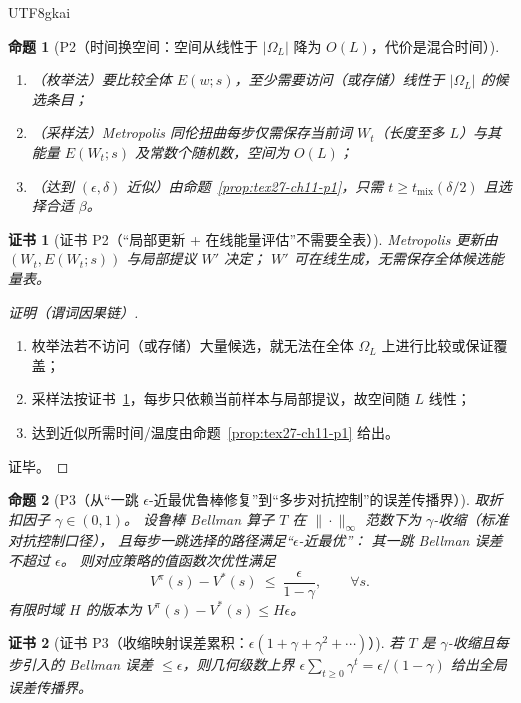 \documentclass[12pt]{article}
\newtheorem{proposition}{命题}[section]
\newtheorem{Certificate}{证书}[section]
\begin{document}
\begin{CJK*}{UTF8}{gkai}
\begin{proposition}[P2（时间换空间：空间从线性于 $|\Omega_L|$ 降为 $O(L)$，代价是混合时间）]
\label{prop:tex27-ch11-p2}
\begin{enumerate}
  \item（枚举法）要比较全体 $E(w;s)$，至少需要访问（或存储）线性于 $|\Omega_L|$ 的候选条目；
  \item（采样法）Metropolis 同伦扭曲每步仅需保存当前词 $W_t$（长度至多 $L$）与其能量 $E(W_t;s)$ 及常数个随机数，空间为 $O(L)$；
  \item（达到 $(\epsilon,\delta)$ 近似）由命题~\ref{prop:tex27-ch11-p1}，只需 $t\ge t_{\mathrm{mix}}(\delta/2)$ 且选择合适 $\beta$。
\end{enumerate}
\end{proposition}

\begin{Certificate}[证书 P2（“局部更新 + 在线能量评估”不需要全表）]
\label{cert:tex27-ch11-p2}
Metropolis 更新由 $(W_t,E(W_t;s))$ 与局部提议 $W'$ 决定；
$W'$ 可在线生成，无需保存全体候选能量表。
\end{Certificate}

\begin{proof}[证明（谓词因果链）]
\begin{enumerate}
  \item 枚举法若不访问（或存储）大量候选，就无法在全体 $\Omega_L$ 上进行比较或保证覆盖；
  \item 采样法按证书~\ref{cert:tex27-ch11-p2}，每步只依赖当前样本与局部提议，故空间随 $L$ 线性；
  \item 达到近似所需时间/温度由命题~\ref{prop:tex27-ch11-p1} 给出。
\end{enumerate}
证毕。
\end{proof}

\begin{proposition}[P3（从“一跳 $\epsilon$-近最优鲁棒修复”到“多步对抗控制”的误差传播界）]
\label{prop:tex27-ch11-p3}
取折扣因子 $\gamma\in(0,1)$。
设鲁棒 Bellman 算子 $T$ 在 $\|\cdot\|_\infty$ 范数下为 $\gamma$-收缩（标准对抗控制口径），
且每步一跳选择的路径满足“$\epsilon$-近最优”：
其一跳 Bellman 误差不超过 $\epsilon$。
则对应策略的值函数次优性满足
\[
  V^{\pi}(s)-V^\ast(s)\ \le\ \frac{\epsilon}{1-\gamma},
  \qquad
  \forall s.
\]
有限时域 $H$ 的版本为 $V^{\pi}(s)-V^\ast(s)\le H\epsilon$。
\end{proposition}

\begin{Certificate}[证书 P3（收缩映射误差累积：$\epsilon(1+\gamma+\gamma^2+\cdots)$）]
\label{cert:tex27-ch11-p3}
若 $T$ 是 $\gamma$-收缩且每步引入的 Bellman 误差 $\le\epsilon$，则几何级数上界
$\epsilon\sum_{t\ge 0}\gamma^t=\epsilon/(1-\gamma)$ 给出全局误差传播界。
\end{Certificate}


\end{CJK*}
\end{document}
